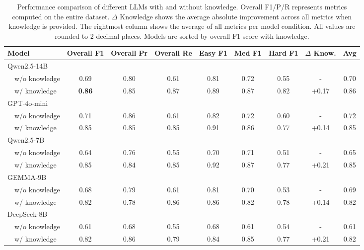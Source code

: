 \begin{table*}
\centering
\begin{tabular}{l|ccc|ccc|c|c}
\hline
\textbf{Model} & \textbf{Overall F1} & \textbf{Overall Pr} & \textbf{Overall Re} & \textbf{Easy F1} & \textbf{Med F1} & \textbf{Hard F1} & $\Delta$ \textbf{Know.} & \textbf{Avg} \\
\hline
Qwen2.5-14B \\
~~w/o knowledge & 0.69 & 0.80 & 0.61 & 0.81 & 0.72 & 0.55 & - & 0.70 \\
~~w/ knowledge & \textbf{0.86} & 0.85 & 0.87 & 0.89 & 0.87 & 0.82 & +0.17 & 0.86 \\
\hline
GPT-4o-mini \\
~~w/o knowledge & 0.71 & 0.86 & 0.61 & 0.82 & 0.72 & 0.60 & - & 0.72 \\
~~w/ knowledge & 0.85 & 0.85 & 0.85 & 0.91 & 0.86 & 0.77 & +0.14 & 0.85 \\
\hline
Qwen2.5-7B \\
~~w/o knowledge & 0.64 & 0.76 & 0.55 & 0.70 & 0.71 & 0.51 & - & 0.65 \\
~~w/ knowledge & 0.85 & 0.84 & 0.85 & 0.92 & 0.87 & 0.77 & +0.21 & 0.85 \\
\hline
GEMMA-9B \\
~~w/o knowledge & 0.68 & 0.79 & 0.61 & 0.81 & 0.70 & 0.53 & - & 0.69 \\
~~w/ knowledge & 0.82 & 0.78 & 0.86 & 0.86 & 0.82 & 0.78 & +0.14 & 0.82 \\
\hline
DeepSeek-8B \\
~~w/o knowledge & 0.61 & 0.68 & 0.55 & 0.68 & 0.61 & 0.54 & - & 0.61 \\
~~w/ knowledge & 0.82 & 0.86 & 0.79 & 0.84 & 0.85 & 0.77 & +0.21 & 0.82 \\
\hline
\end{tabular}
\caption{Performance comparison of different LLMs with and without knowledge. Overall F1/P/R represents metrics computed on the entire dataset. $\Delta$ Knowledge shows the average absolute improvement across all metrics when knowledge is provided. The rightmost column shows the average of all metrics per model condition. All values are rounded to 2 decimal places. Models are sorted by overall F1 score with knowledge.}
\label{tab:llm_performance}
\end{table*}
